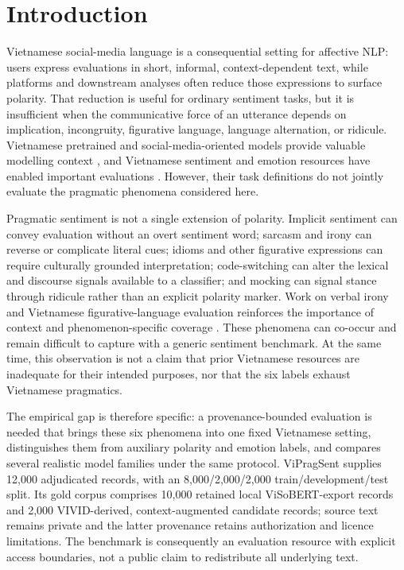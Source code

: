 \section{Introduction}
\label{sec:introduction}

Vietnamese social-media language is a consequential setting for affective NLP: users express evaluations in short, informal, context-dependent text, while platforms and downstream analyses often reduce those expressions to surface polarity. That reduction is useful for ordinary sentiment tasks, but it is insufficient when the communicative force of an utterance depends on implication, incongruity, figurative language, language alternation, or ridicule. Vietnamese pretrained and social-media-oriented models provide valuable modelling context \citep{nguyen-tuan-nguyen-2020-phobert,conneau-etal-2020-unsupervised,nguyen-etal-2023-visobert}, and Vietnamese sentiment and emotion resources have enabled important evaluations \citep{nguyen-etal-2018-uit-vsfc,ho-etal-2020-uit-vsmec,tran-etal-2026-vigoemotions}. However, their task definitions do not jointly evaluate the pragmatic phenomena considered here.

Pragmatic sentiment is not a single extension of polarity. Implicit sentiment can convey evaluation without an overt sentiment word; sarcasm and irony can reverse or complicate literal cues; idioms and other figurative expressions can require culturally grounded interpretation; code-switching can alter the lexical and discourse signals available to a classifier; and mocking can signal stance through ridicule rather than an explicit polarity marker. Work on verbal irony and Vietnamese figurative-language evaluation reinforces the importance of context and phenomenon-specific coverage \citep{ghosh-etal-2019-verbal-irony,rem-lab-2026-vivid}. These phenomena can co-occur and remain difficult to capture with a generic sentiment benchmark. At the same time, this observation is not a claim that prior Vietnamese resources are inadequate for their intended purposes, nor that the six labels exhaust Vietnamese pragmatics.

The empirical gap is therefore specific: a provenance-bounded evaluation is needed that brings these six phenomena into one fixed Vietnamese setting, distinguishes them from auxiliary polarity and emotion labels, and compares several realistic model families under the same protocol. ViPragSent supplies 12,000 adjudicated records, with an 8,000/2,000/2,000 train/development/test split. Its gold corpus comprises 10,000 retained local ViSoBERT-export records and 2,000 VIVID-derived, context-augmented candidate records; source text remains private and the latter provenance retains authorization and licence limitations. The benchmark is consequently an evaluation resource with explicit access boundaries, not a public claim to redistribute all underlying text.

